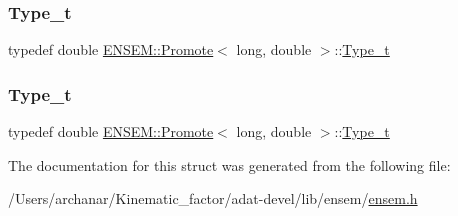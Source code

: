 \mbox{\label{structENSEM_1_1Promote_3_01long_00_01double_01_4_ab96351d39563d95f7a63ce59e9fe2e9d}} 
\subsubsection{\texorpdfstring{Type\_t}{Type\_t}\hspace{0.1cm}{\footnotesize\ttfamily [2/3]}}
{\footnotesize\ttfamily typedef double \mbox{\hyperlink{structENSEM_1_1Promote}{E\+N\+S\+E\+M\+::\+Promote}}$<$ long, double $>$\+::\mbox{\hyperlink{structENSEM_1_1Promote_3_01long_00_01double_01_4_ab96351d39563d95f7a63ce59e9fe2e9d}{Type\+\_\+t}}}

\mbox{\label{structENSEM_1_1Promote_3_01long_00_01double_01_4_ab96351d39563d95f7a63ce59e9fe2e9d}} 
\subsubsection{\texorpdfstring{Type\_t}{Type\_t}\hspace{0.1cm}{\footnotesize\ttfamily [3/3]}}
{\footnotesize\ttfamily typedef double \mbox{\hyperlink{structENSEM_1_1Promote}{E\+N\+S\+E\+M\+::\+Promote}}$<$ long, double $>$\+::\mbox{\hyperlink{structENSEM_1_1Promote_3_01long_00_01double_01_4_ab96351d39563d95f7a63ce59e9fe2e9d}{Type\+\_\+t}}}



The documentation for this struct was generated from the following file\+:\begin{DoxyCompactItemize}
\item 
/\+Users/archanar/\+Kinematic\+\_\+factor/adat-\/devel/lib/ensem/\mbox{\hyperlink{adat-devel_2lib_2ensem_2ensem_8h}{ensem.\+h}}\end{DoxyCompactItemize}
